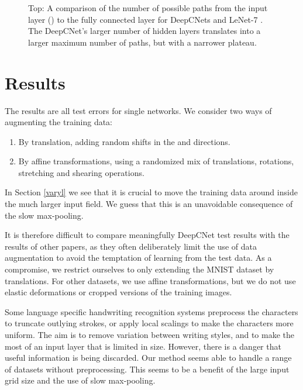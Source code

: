 \documentclass{article}
\numberwithin{equation}{subsection}
\newenvironment{circlist}{
  \begin{enumerate}[]
  \setlength{\itemsep}{0pt}
  \setlength{\parskip}{0pt}
  \setlength{\parsep}{0pt}
}{\end{enumerate}}
\begin{document}
\begin{figure}
\begin{center}
\caption{Top: A comparison of the number of possible paths from the input layer () to the fully connected layer for  DeepCNets and LeNet-7 \cite{lecun-04}. The DeepCNet's larger number of hidden layers translates into a larger maximum number of paths, but with a narrower plateau.
\label{counts}}
\end{center}
\end{figure}




\section{Results}\label{results}
The results are all test errors for single networks.
We consider two ways of augmenting the training data:
\begin{circlist}
\item By translation, adding random shifts in the  and  directions.
\item By affine transformations, using a randomized mix of translations, rotations, stretching and shearing operations.
\end{circlist}
In Section \ref{varyl} we see that it is crucial to move the training data around inside the much larger input field. We guess that this is an unavoidable consequence of the slow max-pooling.

It is therefore difficult to compare meaningfully DeepCNet test results with the results of other papers, as they often deliberately limit the use of data augmentation to avoid the temptation of learning from the test data. As a compromise, we restrict ourselves to only extending the MNIST dataset by translations. For other datasets, we use affine transformations, but we do not use elastic deformations or cropped versions of the training images.

Some language specific handwriting recognition systems preprocess the characters to truncate outlying strokes, or apply local scalings to make the characters more uniform. The aim is to remove variation between writing styles, and to make the most of an input layer that is limited in size. However, there is a danger that useful information is being discarded. Our method seems able to handle a range of datasets without preprocessing. This seems to be a benefit of the large input grid size and the use of slow max-pooling.
\end{document}
